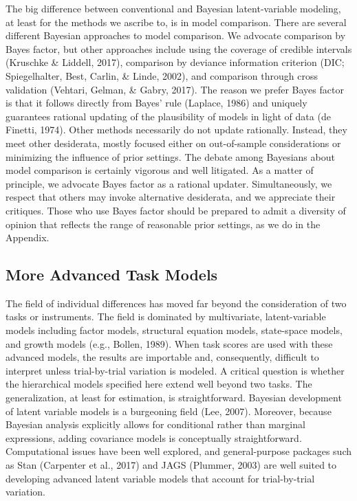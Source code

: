 \documentclass[english,man]{apa6}
\theoremstyle{definition}
\theoremstyle{definition}
\theoremstyle{remark}
\begin{document}
The big difference between conventional and Bayesian latent-variable
modeling, at least for the methods we ascribe to, is in model
comparison. There are several different Bayesian approaches to model
comparison. We advocate comparison by Bayes factor, but other approaches
include using the coverage of credible intervals (Kruschke \& Liddell,
2017), comparison by deviance information criterion (DIC; Spiegelhalter,
Best, Carlin, \& Linde, 2002), and comparison through cross validation
(Vehtari, Gelman, \& Gabry, 2017). The reason we prefer Bayes factor is
that it follows directly from Bayes' rule (Laplace, 1986) and uniquely
guarantees rational updating of the plausibility of models in light of
data (de Finetti, 1974). Other methods necessarily do not update
rationally. Instead, they meet other desiderata, mostly focused either
on out-of-sample considerations or minimizing the influence of prior
settings. The debate among Bayesians about model comparison is certainly
vigorous and well litigated. As a matter of principle, we advocate Bayes
factor as a rational updater. Simultaneously, we respect that others may
invoke alternative desiderata, and we appreciate their critiques. Those
who use Bayes factor should be prepared to admit a diversity of opinion
that reflects the range of reasonable prior settings, as we do in the
Appendix.

\subsection{More Advanced Task Models}\label{more-advanced-task-models}

The field of individual differences has moved far beyond the
consideration of two tasks or instruments. The field is dominated by
multivariate, latent-variable models including factor models, structural
equation models, state-space models, and growth models (e.g., Bollen,
1989). When task scores are used with these advanced models, the results
are importable and, consequently, difficult to interpret unless
trial-by-trial variation is modeled. A critical question is whether the
hierarchical models specified here extend well beyond two tasks. The
generalization, at least for estimation, is straightforward. Bayesian
development of latent variable models is a burgeoning field (Lee, 2007).
Moreover, because Bayesian analysis explicitly allows for conditional
rather than marginal expressions, adding covariance models is
conceptually straightforward. Computational issues have been well
explored, and general-purpose packages such as Stan (Carpenter et al.,
2017) and JAGS (Plummer, 2003) are well suited to developing advanced
latent variable models that account for trial-by-trial variation.
\end{document}
